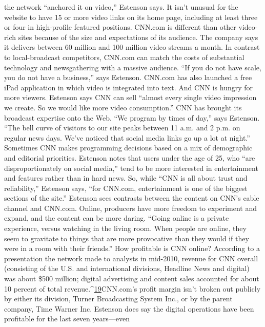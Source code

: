 the network ``anchored it on video,'' Estenson says. It isn't unusual for the website
to have 15 or more video links on its home page, including at least three or four
in high-profile featured positions.
CNN.com is different than other video-rich sites because of the size and expectations
of its audience. The company says it delivers between 60 million and
100 million video streams a month. In contrast to local-broadcast competitors,
CNN.com can match the costs of substantial technology and newsgathering
with a massive audience. ``If you do not have scale, you do not have a business,''
says Estenson. CNN.com has also launched a free iPad application in which
video is integrated into text. And CNN is hungry for more viewers. Estenson
says CNN can sell ``almost every single video impression we create. So we would
like more video consumption.''
CNN has brought its broadcast expertise onto the Web. ``We program by times
of day,'' says Estenson. ``The bell curve of visitors to our site peaks between 11
a.m. and 2 p.m. on regular news days. We've noticed that social media links go up
a lot at night.'' Sometimes CNN makes programming decisions based on a mix
of demographic and editorial priorities. Estenson notes that users under the age
of 25, who ``are disproportionately on social media,'' tend to be more interested
in entertainment and features rather than in hard news. So, while ``CNN is all
about trust and reliability,'' Estenson says, ``for CNN.com, entertainment is one
of the biggest sections of the site.''
Estenson sees contrasts between the content on CNN's cable channel and
CNN.com. Online, producers have more freedom to experiment and expand,
and the content can be more daring. ``Going online is a private experience, versus
watching in the living room. When people are online, they seem to gravitate to
things that are more provocative than they would if they were in a room with
their friends.''
How profitable is CNN online? According to a presentation the network made
to analysts in mid-2010, revenue for CNN overall (consisting of the U.S. and international
divisions, Headline News and digital) was about \$500 million; digital
advertising and content sales accounted for about 10 percent of total revenue.^{\href{#endnotes-chapter-4}{19}}CNN.com's profit margin isn't broken out publicly by either its division, Turner
Broadcasting System Inc., or by the parent company, Time Warner Inc. Estenson
does say the digital operations have been profitable for the last seven years—even
